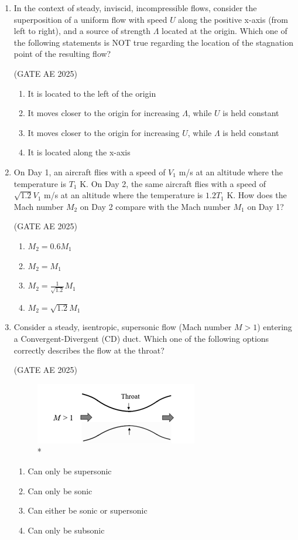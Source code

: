 \documentclass[journal,12pt,onecolumn]{IEEEtran}
\theoremstyle{remark}
\begin{document}
\begin{flushleft}
\begin{enumerate}
\item In the context of steady, inviscid, incompressible flows, consider the superposition of a uniform flow with speed $U$ along the positive x-axis (from left to right), and a source of strength $\Lambda$ located at the origin. Which one of the following statements is NOT true regarding the location of the stagnation point of the resulting flow?

\hfill (GATE AE 2025)

\begin{enumerate}
     \item It is located to the left of the origin
    \item It moves closer to the origin for increasing $\Lambda$, while $U$ is held constant
    \item It moves closer to the origin for increasing $U$, while $\Lambda$ is held constant
    \item It is located along the x-axis
\end{enumerate}

\item  On Day 1, an aircraft flies with a speed of $V_1$ m/s at an altitude where the temperature is $T_1$ K. On Day 2, the same aircraft flies with a speed of $\sqrt{1.2}V_1$ m/s at an altitude where the temperature is $1.2T_1$ K. How does the Mach number $M_2$ on Day 2 compare with the Mach number $M_1$ on Day 1?

\hfill (GATE AE 2025)

\begin{enumerate}
    \item $M_2 = 0.6 M_1$
    \item $M_2 = M_1$
    \item $M_2 = \frac{1}{\sqrt{1.2}} M_1$
    \item $M_2 = \sqrt{1.2} M_1$
\end{enumerate}
    
\item Consider a steady, isentropic, supersonic flow (Mach number $M > 1$) entering a Convergent-Divergent (CD) duct. Which one of the following options correctly describes the flow at the throat?

\hfill (GATE AE 2025)

\begin{figure}[H]
\includegraphics[width=0.5\columnwidth]{figs/throat.png}
\caption{*}
    \label{fig:placeholder}
\end{figure}
\begin{enumerate}
    \item Can only be supersonic
    \item Can only be sonic
    \item Can either be sonic or supersonic
    \item Can only be subsonic
\end{enumerate}


\end{enumerate}
\end{flushleft}
\end{document}
